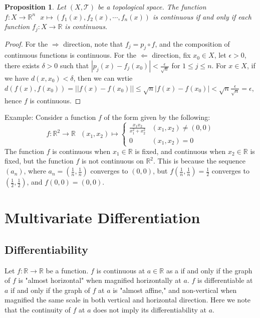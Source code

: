 \documentclass[11pt,oneside]{book}
\theoremstyle{break}
\theoremstyle{break}
\newtheorem{prop}[lem]{Proposition}
\newcommand{\R}{\mathbb{R}}
\newcommand{\T}{\mathcal{T}}
\newcommand{\example}{\color{green}Example: \color{black}}
\begin{document}
\begin{prop}
Let $(X,\T)$ be a topological space. The function $f: X\to \R^n \ \ \ x\mapsto (f_1(x),f_2(x),\cdots, f_n(x))$ is continuous if and only if each function $f_j:X \to \R$ is continuous.
\end{prop}
\begin{proof}
For the $\Rightarrow$ direction, note that $f_j = p_j \circ f$, and the composition of continuous functions is continuous. For the $\Leftarrow$ direction, fix $x_0 \in X$, let $\epsilon>0$, there exists $\delta >0 $ such that $|p_j(x)-f_j(x_0)|< \frac{\epsilon}{\sqrt{n}}$ for $1\leq j \leq n$. For $x \in X$, if we have $d(x,x_0) < \delta$, then we can wrtie $d(f(x),f(x_0)) = ||f(x)-f(x_0)|| \leq \sqrt{n}|f(x)-f(x_0)| < \sqrt{n}\frac{\epsilon}{\sqrt{n}} = \epsilon$, hence $f$ is continuous.
\end{proof}

\example Consider a function $f$ of the form given by the following: $$f: \R^2 \to \R \ \ \ (x_1,x_2) \mapsto \begin{cases} \frac{x_1x_2}{x_1^2+x_2^2} & (x_1,x_2) \neq (0,0)\\ 0 & (x_1,x_2) = 0 
\end{cases}$$
The function $f$ is continuous when $x_1 \in \R$ is fixed, and continuous when $x_2\in \R$ is fixed, but the function $f$ is not continuous on $\R^2$. This is because the sequence $(a_n)$, where $a_n = (\frac{1}{n},\frac{1}{n})$ converges to $(0,0)$, but $f(\frac{1}{n},\frac{1}{n}) = \frac{1}{2}$ converges to $(\frac{1}{2},\frac{1}{2})$, and $f(0,0) = (0,0)$. 

\chapter{Multivariate Differentiation}
\setcounter{section}{4}
\section[Differentiability]{\color{red} Differentiability \color{black}}
Let $f:\R \to \R$ be a function. $f$ is continuous at $a\in \R$ as a if and only if the graph of $f$ is "almost horizontal" when magnified horizontally at $a$. $f$ is differentiable at $a$ if and only if the graph of $f$ at $a$ is "almost affine," and non-vertical when magnified the same scale in both vertical and horizontal direction. Here we note that the continuity of $f$ at $a$ does not imply its differentiability at $a$.\\
\end{document}
